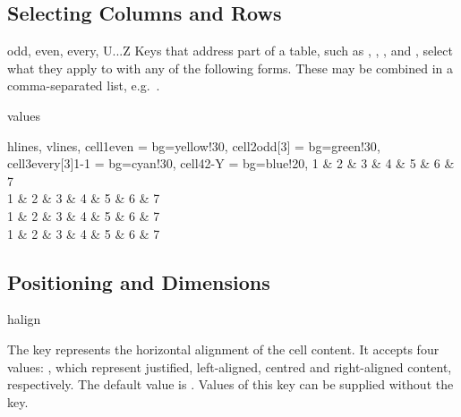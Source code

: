 \subsection{Selecting Columns and Rows}\label{inner:selectors}
\begin{codedescribe}[
    value,
    new=2021F,
    update=2021P,
    update=2022A,
    update=2025A
  ]{odd, even, every, U...Z}
  Keys that address part of a table, such as , , ,  and , select what they apply to with any of the following forms. These may be combined in a comma-separated list, e.g.\ .
  \begin{describelist*}{values}
  \end{describelist*}

  \begin{codestore}[st=columns:selectors]
    \begin{tblr}{
      hlines, vlines,
      cell{1}{even} = {bg=yellow!30},
      cell{2}{odd[3]} = {bg=green!30},
      cell{3}{every[3]{1}{-1}} = {bg=cyan!30},
          cell{4}{2-Y} = {bg=blue!20},
        }
      1 & 2 & 3 & 4 & 5 & 6 & 7 \\
      1 & 2 & 3 & 4 & 5 & 6 & 7 \\
      1 & 2 & 3 & 4 & 5 & 6 & 7 \\
      1 & 2 & 3 & 4 & 5 & 6 & 7
    \end{tblr}\end{codestore}
  \begin{center}
  \end{center}
\end{codedescribe}

\subsection{Positioning and Dimensions}
\begin{codedescribe}[
    key,
    new=2021L
  ]{halign}
  \begin{codesyntax}
  \end{codesyntax}
  The  key represents the horizontal alignment of the cell content. It accepts four values: , which represent justified, left-aligned, centred and right-aligned content, respectively. The default value is . Values of this key can be supplied without the key.
\end{codedescribe}

